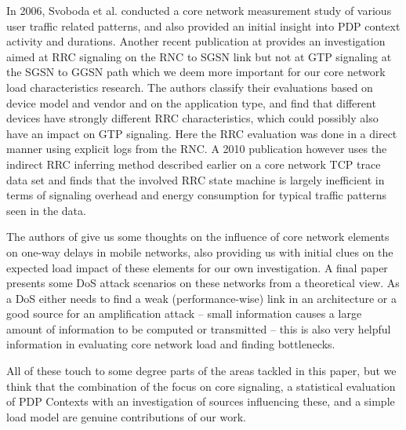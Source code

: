 In 2006, Svoboda et al. \cite{svoboda2006composition} conducted a core network measurement study of various user traffic related patterns, and also provided an initial insight into \gls{PDP} context activity and durations. Another recent publication at \cite{he2012panoramic} provides an investigation aimed at \gls{RRC} signaling on the \gls{RNC} to \gls{SGSN} link but not at \gls{GTP} signaling at the \gls{SGSN} to \gls{GGSN} path which we deem more important for our core network load characteristics research. The authors classify their evaluations based on device model and vendor and on the application type, and find that different devices have strongly different \gls{RRC} characteristics, which could possibly also have an impact on \gls{GTP} signaling. Here the \gls{RRC} evaluation was done in a direct manner using explicit logs from the \gls{RNC}. A 2010 publication\cite{Qian:2010:CRR:1879141.1879159} however uses the indirect \gls{RRC} inferring method described earlier on a core network TCP trace data set and finds that the involved \gls{RRC} state machine is largely inefficient in terms of signaling overhead and energy consumption for typical traffic patterns seen in the data.

The authors of \cite{4675847} give us some thoughts on the influence of core network elements on one-way delays in mobile networks, also providing us with initial clues on the expected load impact of these elements for our own investigation. A final paper \cite{Ricciato2010551} presents some \gls{DoS} attack scenarios on these networks from a theoretical view. As a \gls{DoS} either needs to find a weak (performance-wise) link in an architecture or a good source for an amplification attack -- small information causes a large amount of information to be computed or transmitted -- this is also very helpful information in evaluating core network load and finding bottlenecks.

All of these touch to some degree parts of the areas tackled in this paper, but we think that the combination of the focus on core signaling, a statistical evaluation of PDP Contexts with an investigation of sources influencing these, and a simple load model are genuine contributions of our work.


